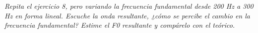 


\emph{Repita el ejercicio 8, pero variando la frecuencia fundamental desde 200 Hz a 300 Hz en forma
lineal. Escuche la onda resultante, ¿cómo se percibe el cambio en la frecuencia fundamental?
Estime el F0 resultante y compárelo con el teórico.}

